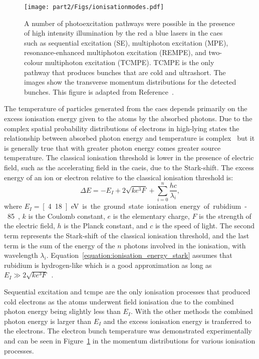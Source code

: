 \begin{figure}
    \center
    \texttt{[image: part2/Figs/ionisationmodes.pdf]}
    \caption[Photoexcitation pathways.]{A number of photoexcitation pathways were possible in the presence of high intensity illumination by the red a blue lasers in the \gls{caes} such as sequential excitation (SE), multiphoton excitation (MPE), resonance-enhanced multiphoton excitation (REMPE), and two-colour multiphoton excitation (TCMPE). TCMPE is the only pathway that produces bunches that are cold and ultrashort. The images show the transverse momentum distributions for the detected bunches.
    This figure is adapted from Reference~\cite{speirs_electron_2017}.}
    \label{figure:ionisation_modes}
\end{figure}

The temperature of particles generated from the \gls{caes} depends primarily on the excess ionisation energy given to the atoms by the absorbed photons.
Due to the complex spatial probability distributions of electrons in high-lying states the relationship between absorbed photon energy and temperature is complex~\cite{mcculloch_high-coherence_2013} but it is generally true that with greater photon energy comes greater source temperature.
The classical ionisation threshold is lower in the presence of electric field, such as the accelerating field in the \gls{caeis}, due to the Stark-shift.
The excess energy of an ion or electron relative to the classical ionisation threshold is:
\begin{equation}\label{equation:ionisation_energy_stark}
\Delta E = -E_I + 2\sqrt{ke^3F} + \sum_{i=0}^{n}{\frac{hc}{\lambda_i}},
\end{equation}
where $E_I=$\,\unit[4.18]{eV} is the ground state ionisation energy of rubidium-85, $k$ is the Coulomb constant, $e$ is the elementary charge, $F$ is the strength of the electric field, $h$ is the Planck constant, and $c$ is the speed of light.
The second term represents the Stark-shift of the classical ionisation threshold, and the last term is the sum of the energy of the $n$ photons involved in the ionisation, with wavelength $\lambda_i$.
Equation~\ref{equation:ionisation_energy_stark} assumes that rubidium is hydrogen-like which is a good approximation as long as $E_I \gg 2\sqrt{ke^3F}$~\cite{gallagher_rydberg_2005}.

Sequential excitation and \gls{tcmpe} are the only ionisation processes that produced cold electrons as the atoms underwent field ionisation due to the combined photon energy being slightly less than $E_I$.
With the other methods the combined photon energy is larger than $E_I$ and the excess ionisation energy is tranferred to the electrons.
The electron bunch temperature was demonstrated experimentally~\cite{speirs_identification_2017} and can be seen in Figure~\ref{figure:ionisation_modes} in the momentum distributions for various ionisation processes.

